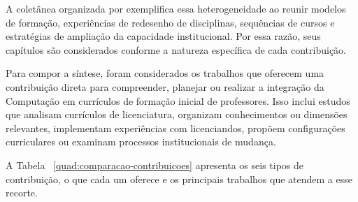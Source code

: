 A coletânea organizada por  exemplifica essa heterogeneidade ao reunir modelos de formação, experiências de redesenho de disciplinas, sequências de cursos e estratégias de ampliação da capacidade institucional. Por essa razão, seus capítulos são considerados conforme a natureza específica de cada contribuição.

Para compor a síntese, foram considerados os trabalhos que oferecem uma contribuição direta para compreender, planejar ou realizar a integração da Computação em currículos de formação inicial de professores. Isso inclui estudos que analisam currículos de licenciatura, organizam conhecimentos ou dimensões relevantes, implementam experiências com licenciandos, propõem configurações curriculares ou examinam processos institucionais de mudança.

A Tabela ~\ref{quad:comparacao-contribuicoes} apresenta os seis tipos de contribuição, o que cada um oferece e os principais trabalhos que atendem a esse recorte.


